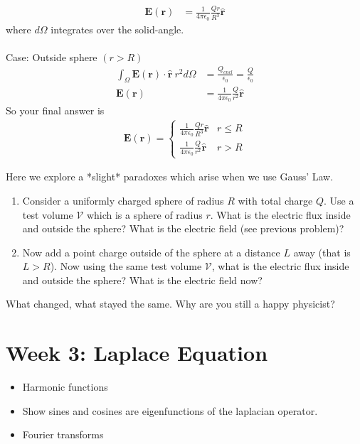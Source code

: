 \documentclass[12pt,fleqn]{article}
\numberwithin{equation}{section} %
\newcounter{problem}
\newcounter{answer}
\begin{document}
\begin{answer}
\begin{align}
		\mathbf E(\mathbf r) & = \frac{1}{4\pi \epsilon_0} \frac{Q r}{R^3} \mathbf{\hat r}
	\end{align}
	where $d\Omega$ integrates over the solid-angle.\\
	\\
	Case: Outside sphere $(r > R)$
	\begin{align}
		\int_\Omega \mathbf E(\mathbf r) \cdot \mathbf{\hat r} ~ r^2 d\Omega & = \frac{Q_{encl}}{\epsilon_0} = \frac{Q}{\epsilon_0}\\
		\mathbf E(\mathbf r) & = \frac{1}{4\pi \epsilon_0}\frac{Q}{r^2} \mathbf{\hat r}
	\end{align}
	So your final answer is
	\begin{align}
		\boxed{\mathbf E(\mathbf r) = \begin{cases}
			\frac{1}{4\pi \epsilon_0} \frac{Q r}{R^3} \mathbf{\hat r} & r \leq R\\
			\frac{1}{4\pi \epsilon_0}\frac{Q}{r^2} \mathbf{\hat r} & r > R
		\end{cases}}
	\end{align}
	
\end{answer}

\begin{problem}
	Here we explore a *slight* paradoxes which arise when we use Gauss' Law. 
	\begin{enumerate}
		\item Consider a uniformly charged sphere of radius $R$ with total charge $Q$. Use a test volume $\mathcal V$ which is a sphere of radius $r$. What is the electric flux inside and outside the sphere? What is the electric field (see previous problem)?
		\item Now add a point charge outside of the sphere at a distance $L$ away (that is $L > R$). Now using the same test volume $\mathcal V$, what is the electric flux inside and outside the sphere? What is the electric field now?
	\end{enumerate}
	What changed, what stayed the same. Why are you still a happy physicist?
\end{problem}



\newpage
\section{Week 3: Laplace Equation}
\begin{itemize}
	\item Harmonic functions
	\item Show sines and cosines are eigenfunctions of the laplacian operator.
	\item Fourier transforms
\end{itemize}
\end{document}
